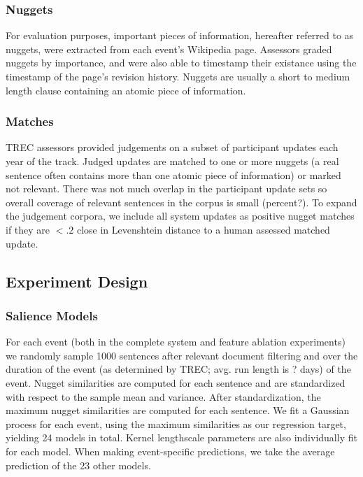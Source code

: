 \subsubsection{Nuggets}
For evaluation purposes, important pieces of information, hereafter 
referred to as nuggets, were extracted from each event's Wikipedia page.
Assessors graded nuggets by importance, and were also able to timestamp their
existance using the timestamp of the page's revision history. Nuggets are 
usually a short to medium length clause containing an atomic piece of
information.

\subsubsection{Matches}
TREC assessors provided judgements on a subset of participant updates each year
of the track. Judged updates are matched to one or more nuggets (a real 
sentence often contains more than one atomic piece of information) or marked
not relevant. There was not much overlap in the participant update sets so
overall coverage of relevant sentences in the corpus is small (percent?).
To expand the judgement corpora, we include all system updates as positive
nugget matches if they are $< .2$ close in Levenshtein distance to a human
assessed matched update. 

\subsection{Experiment Design}

\subsubsection{Salience Models}
For each event (both in the complete system and feature ablation experiments)
we randomly sample 1000 sentences after relevant document filtering and 
over the duration of the event 
(as determined by 
TREC; avg. run length is ? days) of the event. Nugget similarities
are computed for each sentence and are standardized with respect to 
the sample mean and variance. After standardization, the maximum nugget similarities are computed for each sentence. 
We fit a Gaussian process for each event, using the maximum similarities 
as our regression target, yielding 24 models in total. Kernel lengthscale
parameters are also individually fit for each model.
When making event-specific predictions, we take the average prediction of the
23 other models.

